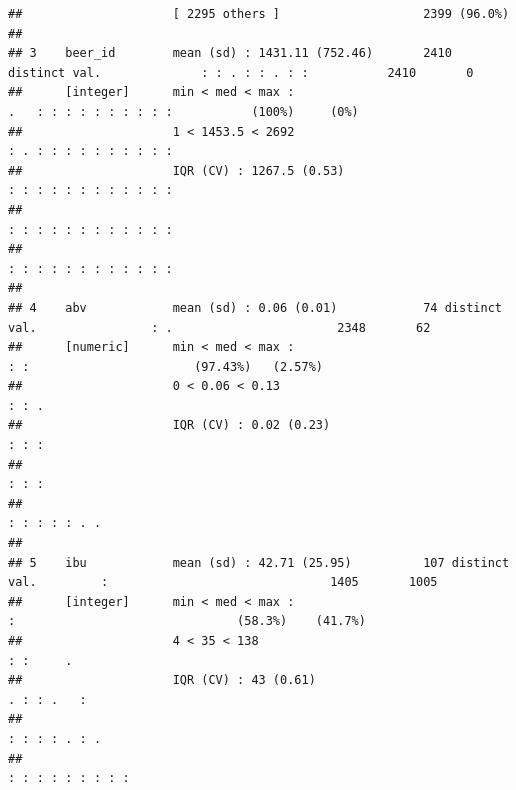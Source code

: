 \documentclass[]{article}
\begin{document}
\begin{verbatim}
##                     [ 2295 others ]                    2399 (96.0%)                                                                  
## 
## 3    beer_id        mean (sd) : 1431.11 (752.46)       2410 distinct val.              : : . : : . : :           2410       0        
##      [integer]      min < med < max :                                          .   : : : : : : : : : :           (100%)     (0%)     
##                     1 < 1453.5 < 2692                                          : . : : : : : : : : : :                               
##                     IQR (CV) : 1267.5 (0.53)                                   : : : : : : : : : : : :                               
##                                                                                : : : : : : : : : : : :                               
##                                                                                : : : : : : : : : : : :                               
## 
## 4    abv            mean (sd) : 0.06 (0.01)            74 distinct val.                : .                       2348       62       
##      [numeric]      min < med < max :                                                  : :                       (97.43%)   (2.57%)  
##                     0 < 0.06 < 0.13                                                    : : .                                         
##                     IQR (CV) : 0.02 (0.23)                                             : : :                                         
##                                                                                        : : :                                         
##                                                                                      : : : : : . .                                   
## 
## 5    ibu            mean (sd) : 42.71 (25.95)          107 distinct val.         :                               1405       1005     
##      [integer]      min < med < max :                                            :                               (58.3%)    (41.7%)  
##                     4 < 35 < 138                                                 : :     .                                           
##                     IQR (CV) : 43 (0.61)                                       . : : .   :                                           
##                                                                                : : : : . : .                                         
##                                                                                : : : : : : : : :                                     

\end{verbatim}
\end{document}
